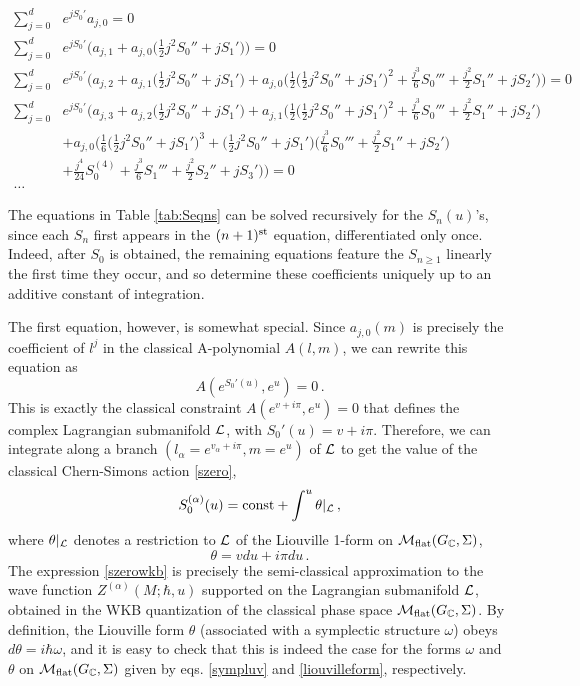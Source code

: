 \documentclass[hyper]{JHEP3}
\def\CL {{\cal L}}
\newcommand{\C}{{\mathbb{C}}}
\newcommand{\M}{{{\cal M}}_{{\rm flat}}}
\newcommand\be{\begin{equation}}
\newcommand\ee{\end{equation}}
\begin{document}
\begin{table}[htb]
\small
\begin{align*}
\sum_{j=0}^d& e^{j S_0'} a_{j,0} = 0
        \\
\sum_{j=0}^d& e^{j S_0'}\biggl(a_{j,1} + a_{j,0}\bigl(\frac{1}{2}j^2S_0'' + j S_1'\bigr)\biggr) = 0
        \\
\sum_{j=0}^d& e^{j S_0'}\biggl(a_{j,2} + a_{j,1}\bigl(\frac{1}{2}j^2S_0'' + j S_1'\bigr) + a_{j,0}\biggl(\frac{1}{2}\bigl(\frac{1}{2}j^2S_0'' + j S_1'\bigr)^2
+ \frac{j^3}{6}S_0''' + \frac{j^2}{2} S_1'' + jS_2'\biggr)\biggr) = 0
        \\
\sum_{j=0}^d&  e^{j S_0'}\biggl(a_{j,3} + a_{j,2}\bigl(\frac{1}{2}j^2S_0'' + j S_1'\bigr) + a_{j,1}\biggl(\frac{1}{2}\bigl(\frac{1}{2}j^2S_0'' + j S_1'\bigr)^2
+ \frac{j^3}{6}S_0''' + \frac{j^2}{2} S_1'' + jS_2'\biggr)
        \\
&+ a_{j,0}\biggl(\frac{1}{6}\bigl(\frac{1}{2}j^2S_0'' + j S_1'\bigr)^3 + \bigl(\frac{1}{2}j^2S_0'' + j S_1'\bigr)\bigl(\frac{j^3}{6}S_0''' + \frac{j^2}{2} S_1'' + jS_2'\bigr)
        \\
&+ \frac{j^4}{24} S_0^{(4)} + \frac{j^3}{6}S_1''' + \frac{j^2}{2}S_2'' + jS_3'\biggr)\biggr) = 0 \\ \ldots
\end{align*}
\caption{Hierarchy of differential equations derived from $\widehat{A} (\hat l, \hat m ) ~Z^{(\alpha)} (M;\hbar,u) = 0$.}
\label{tab:Seqns}
\end{table}

The equations in Table \ref{tab:Seqns} can be solved recursively for the $S_n(u)$'s,
since each $S_n$ first appears in the $(n+1)^{{\rm st}}$ equation, differentiated only once.
Indeed, after $S_0$ is obtained, the remaining equations feature the $S_{n\geq1}$
linearly the first time they occur, and so determine these coefficients uniquely up to
an additive constant of integration.

The first equation, however, is somewhat special. Since $a_{j,0}(m)$ is precisely the coefficient
of $l^j$ in the classical A-polynomial $A(l,m)$, we can rewrite this equation as
\be
A(e^{S_0'(u)},e^u)=0\,.
\ee
This is exactly the classical constraint $A (e^{v + i\pi} , e^u) = 0$ that defines
the complex Lagrangian submanifold $\CL$, with $S_0'(u) = v + i\pi$.
Therefore, we can integrate
along a branch $(l_\alpha=e^{v_\alpha+i\pi},m=e^u)$ of $\CL$ to get the value of
the classical Chern-Simons action \eqref{szero},
\be
S_0^{(\alpha)}(u) = {\rm const} + \int^u \theta \vert_{\CL}\,,
\label{szerowkb}
\ee
where $\theta \vert_{\CL}$ denotes a restriction to $\CL$
of the Liouville 1-form on $\M (G_{\C}, \Sigma)$,
\be
\theta = v du + i \pi du\,.
\label{liouvilleform}
\ee
The expression \eqref{szerowkb} is precisely the semi-classical approximation to
the wave function $Z^{(\alpha)} (M;\hbar,u)$ supported on the Lagrangian submanifold $\CL$,
obtained in the WKB quantization of the classical phase space $\M (G_{\C}, \Sigma)$.
By definition, the Liouville form $\theta$ (associated with a symplectic structure $\omega$)
obeys $d \theta = i \hbar \omega$, and it is easy to check that this is indeed the case for
the forms $\omega$ and $\theta$ on $\M (G_{\C}, \Sigma)$
given by eqs. \eqref{sympluv} and \eqref{liouvilleform}, respectively.
\end{document}
